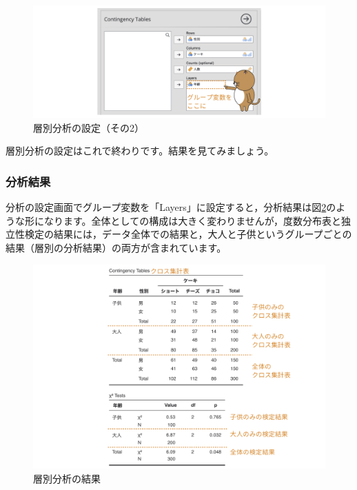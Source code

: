 \documentclass[
  12pt,
  a5jpaper,
  lualatex, ja=standard]{bxjsbook}
\begin{document}
\begin{figure}[!ht]

{\centering \includegraphics[width=1\linewidth]{images/frequencies/chisq-layer-set-var2} 

}

\caption{層別分析の設定（その2）}\label{fig:frequencies-chisq-layer-set-var2}
\end{figure}

層別分析の設定はこれで終わりです。結果を見てみましょう。

\hypertarget{subsub:frequencies-chisq-layer-results}{%
\subsubsection*{分析結果}\label{subsub:frequencies-chisq-layer-results}}

分析の設定画面でグループ変数を「Layers」に設定すると，分析結果は図\ref{fig:frequencies-chisq-layer-results}のような形になります。全体としての構成は大きく変わりませんが，度数分布表と独立性検定の結果には，データ全体での結果と，大人と子供というグループごとの結果（層別の分析結果）の両方が含まれています。

\begin{figure}[!ht]

{\centering \includegraphics[width=1\linewidth]{images/frequencies/chisq-layer-results} 

}

\caption{層別分析の結果}\label{fig:frequencies-chisq-layer-results}
\end{figure}
\end{document}
